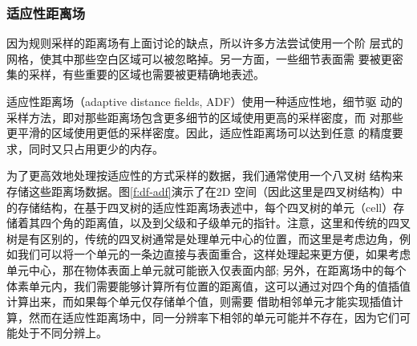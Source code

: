 \subsubsection{适应性距离场}
因为规则采样的距离场有上面讨论的缺点，所以许多方法尝试使用一个阶 层式的网格，使其中那些空白区域可以被忽略掉。另一方面，一些细节表面需 要被更密集的采样，有些重要的区域也需要被更精确地表述。

适应性距离场（adaptive distance fields, ADF）使用一种适应性地，细节驱 动的采样方法，即对那些距离场包含更多细节的区域使用更高的采样密度，而 对那些更平滑的区域使用更低的采样密度。因此，适应性距离场可以达到任意 的精度要求，同时又只占用更少的内存。

为了更高效地处理按适应性的方式采样的数据，我们通常使用一个八叉树 结构来存储这些距离场数据。图\ref{f:df-adf}演示了在2D 空间（因此这里是四叉树结构）中的存储结构，在基于四叉树的适应性距离场表述中，每个四叉树的单元（cell）存储着其四个角的距离值，以及到父级和子级单元的指针。注意，这里和传统的四叉树是有区别的，传统的四叉树通常是处理单元中心的位置，而这里是考虑边角，例如我们可以将一个单元的一条边直接与表面重合，这样处理起来更方便，如果考虑单元中心，那在物体表面上单元就可能嵌入仅表面内部; 另外，在距离场中的每个体素单元内，我们需要能够计算所有位置的距离值，这可以通过对四个角的值插值计算出来，而如果每个单元仅存储单个值，则需要 借助相邻单元才能实现插值计算，然而在适应性距离场中，同一分辨率下相邻的单元可能并不存在，因为它们可能处于不同分辨上。


